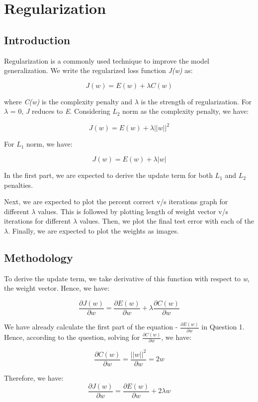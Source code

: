 \documentclass{article}
\begin{document}
\newpage
\section{Regularization}

\subsection{Introduction}

Regularization is a commonly used technique to improve the model generalization. We write the regularized loss function \emph{J(w)} as:

$$J(w) = E(w) + \lambda C(w)$$

where \emph{C(w)} is the complexity penalty and $\lambda$ is the strength of regularization. For $\lambda$ = 0, \emph{J} reduces to \emph{E}. Considering $L_{2}$ norm as the complexity penalty, we have:

$$J(w) = E(w) + \lambda ||w||^2$$

For $L_{1}$ norm, we have:

$$J(w) = E(w) + \lambda |w|$$

In the first part, we are expected to derive the update term for both $L_{1}$ and $L_{2}$ penalties.

Next, we are expected to plot the percent correct v/s iterations graph for different $\lambda$ values. This is followed by plotting length of weight vector v/s iterations for different $\lambda$ values. Then, we plot the final test error with each of the $\lambda$. Finally, we are expected to plot the weights as images.

\subsection{Methodology}

To derive the update term, we take derivative of this function with respect to \emph{w}, the weight vector. Hence, we have:

$$\frac{\partial J(w)}{\partial w} = \frac{\partial E(w)}{\partial w} + \lambda\frac{\partial C(w)}{\partial w}$$

We have already calculate the first part of the equation - $\frac{\partial E(w)}{\partial w}$ in Question 1. Hence, according to the question, solving for $\frac{\partial C(w)}{\partial w}$, we have:

$$\frac{\partial C(w)}{\partial w} = \frac{||w||^2}{\partial w} = 2w$$

Therefore, we have:
$$\frac{\partial J(w)}{\partial w} = \frac{\partial E(w)}{\partial w} + 2\lambda w$$
\end{document}
